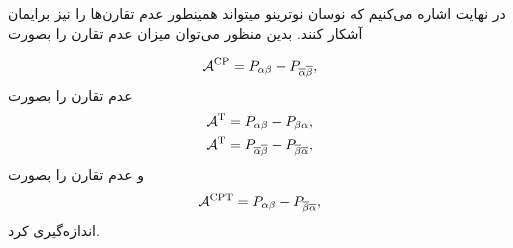 \documentclass[a4paper]{book}
\begin{document}
در نهایت اشاره می‌کنیم که نوسان نوترینو میتواند همینطور عدم تقارن‌ها را نیز برایمان آشکار کنند. بدین منظور می‌توان میزان عدم تقارن  را بصورت
\par
\vspace{-0.5cm}
{\footnotesize\begin{align}
	\mathcal{A}^{\rm CP}=P_{\alpha \beta}-P_{\overline{\alpha} \overline{\beta}},
	\label{eq:CP-violation}
\end{align}}
عدم تقارن  را بصورت
{\footnotesize\begin{align}
	\mathcal{A}^{\rm T}=P_{\alpha \beta}-P_{\beta \alpha},\notag\\
	\mathcal{A}^{\rm T}=P_{\overline{\alpha} \overline{\beta}}-P_{\overline{\beta} \overline{\alpha}},
\end{align}}
و عدم تقارن  را بصورت
{\footnotesize\begin{align}
	\mathcal{A}^{\rm CPT}=P_{\alpha \beta}-P_{\overline{\beta} \overline{\alpha}},
\end{align}}
اندازه‌گیری کرد.
		
\end{document}
